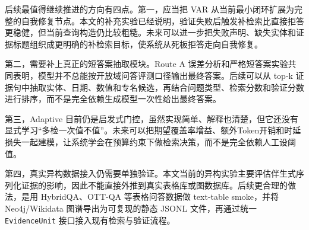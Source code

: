 后续最值得继续推进的方向有四点。第一，应当把 VAR 从当前最小闭环扩展为完整的自我修复节点。本文的补充实验已经说明，验证失败后触发补检索比直接拒答更稳健，但当前查询构造仍比较粗糙。未来可以进一步把失败声明、缺失实体和证据标题组织成更明确的补检索目标，使系统从死板拒答走向自我修复。

第二，需要补上真正的短答案抽取模块。Route A 误差分析和严格短答案实验共同表明，模型并不总能按开放域问答评测口径输出最终答案。后续可以从 top-k 证据句中抽取实体、日期、数值和专名候选，再结合问题类型、检索分数和验证分数进行排序，而不是完全依赖生成模型一次性给出最终答案。

第三，Adaptive 目前仍是启发式门控，虽然实现简单、解释也清楚，但它还没有显式学习“多检一次值不值”。未来可以把期望覆盖率增益、额外Token开销和时延损失一起建模，让系统学会在预算约束下做检索决策，而不是完全依赖人工设阈值。

第四，真实异构数据接入仍需要单独验证。本文当前的异构实验主要评估伴生式序列化证据的影响，因此不能直接外推到真实表格库或图数据库。后续更合理的做法，是用 HybridQA、OTT-QA 等表格问答数据做 text-table smoke，并将 Neo4j/Wikidata 图谱导出为可复现的静态 JSONL 文件，再通过统一 \texttt{EvidenceUnit} 接口接入现有检索与验证流程。
